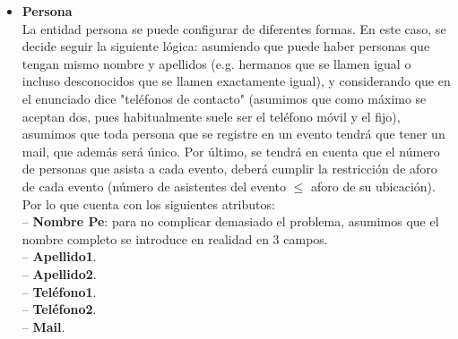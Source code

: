 \documentclass[12pt]{article}
\begin{document}
\begin{itemize}
        \item \textbf{Persona}\\
            La entidad persona se puede configurar de diferentes formas. En este caso, se decide seguir la siguiente lógica:
            asumiendo que puede haber personas que tengan mismo nombre y apellidos (e.g. hermanos que se llamen igual o incluso 
            desconocidos que se llamen exactamente igual), y considerando que en el enunciado dice "teléfonos de contacto" (asumimos que como máximo se 
            aceptan dos, pues habitualmente suele ser el teléfono móvil y el fijo),
            asumimos que toda persona que se registre en un evento tendrá que tener un mail, que además será único. 
            Por último, se tendrá en cuenta que el número de personas que asista a cada evento, deberá cumplir la restricción de aforo de cada evento 
            (número de asistentes del evento $\leq$ aforo de su ubicación).
            Por lo que cuenta con los siguientes atributos: \\
                \hspace{0.5cm} -- {\bfseries Nombre Pe}: para no complicar demasiado el problema, asumimos que el nombre completo se introduce en realidad en 3 campos. \\
                \hspace{0.5cm} -- {\bfseries Apellido1}. \\
                \hspace{0.5cm} -- {\bfseries Apellido2}. \\
                \hspace{0.5cm} -- {\bfseries Teléfono1}. \\
                \hspace{0.5cm} -- {\bfseries Teléfono2}. \\
                \hspace{0.5cm} -- {\bfseries Mail}.
        

\end{itemize}
\end{document}
